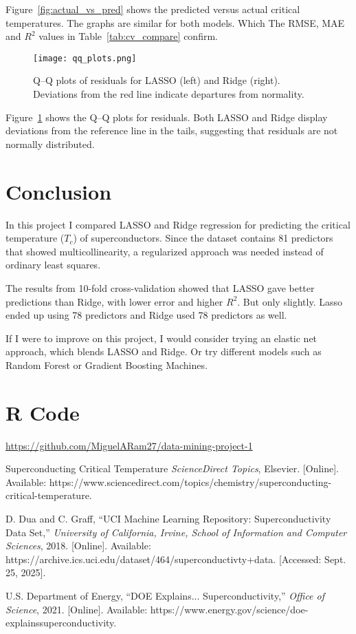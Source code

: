 \documentclass[conference]{IEEEtran}
\begin{document}
Figure~\ref{fig:actual_vs_pred} shows the predicted versus actual critical temperatures. 
The graphs are similar for both models. Which The RMSE, MAE and $R^2$ values in Table~\ref{tab:cv_compare} confirm.

\begin{figure}[htbp]
    \centering
    \texttt{[image: qq\_plots.png]}
    \caption{Q--Q plots of residuals for LASSO (left) and Ridge (right). 
    Deviations from the red line indicate departures from normality.}
    \label{fig:qqplots}
\end{figure}

Figure~\ref{fig:qqplots} shows the Q–Q plots for residuals. Both LASSO and Ridge display deviations from the reference line in the tails, suggesting that residuals are not normally distributed.
\section{Conclusion}
In this project I compared LASSO and Ridge regression for predicting the 
critical temperature ($T_c$) of superconductors. Since the dataset contains 81 
predictors that showed multicollinearity, a regularized approach was needed 
instead of ordinary least squares. 

The results from 10-fold cross-validation showed that LASSO gave better 
predictions than Ridge, with lower error and higher $R^2$. But only slightly. 
Lasso ended up using 78 predictors and Ridge used 78 predictors as well. 

If I were to improve on this project, 
I would consider trying an elastic net approach, which blends LASSO and Ridge. 
Or try different models such as Random Forest or Gradient Boosting Machines.

\appendix


\section{R Code}
\url{https://github.com/MiguelARam27/data-mining-project-1}

\begin{thebibliography}{00}

Superconducting Critical Temperature \emph{ScienceDirect Topics}, Elsevier. [Online]. 
Available: https://www.sciencedirect.com/topics/chemistry/superconducting-critical-temperature. 

D. Dua and C. Graff, ``UCI Machine Learning Repository: Superconductivity Data Set,'' 
\emph{University of California, Irvine, School of Information and Computer Sciences}, 2018. 
[Online]. Available: https://archive.ics.uci.edu/dataset/464/superconductivty+data. 
[Accessed: Sept. 25, 2025].

U.S. Department of Energy, ``DOE Explains... Superconductivity,'' 
\emph{Office of Science}, 2021. [Online]. 
Available: https://www.energy.gov/science/doe-explainssuperconductivity.

\end{thebibliography}
\end{document}
